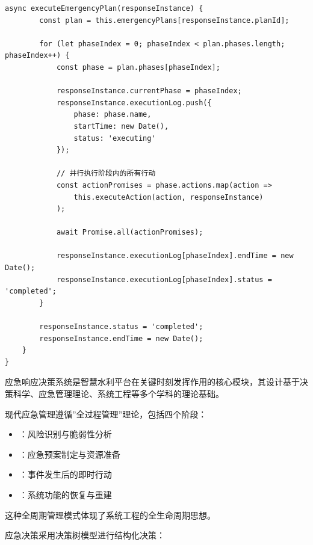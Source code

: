 \begin{lstlisting}[style=javascript]
    async executeEmergencyPlan(responseInstance) {
        const plan = this.emergencyPlans[responseInstance.planId];
        
        for (let phaseIndex = 0; phaseIndex < plan.phases.length; phaseIndex++) {
            const phase = plan.phases[phaseIndex];
            
            responseInstance.currentPhase = phaseIndex;
            responseInstance.executionLog.push({
                phase: phase.name,
                startTime: new Date(),
                status: 'executing'
            });
            
            // 并行执行阶段内的所有行动
            const actionPromises = phase.actions.map(action => 
                this.executeAction(action, responseInstance)
            );
            
            await Promise.all(actionPromises);
            
            responseInstance.executionLog[phaseIndex].endTime = new Date();
            responseInstance.executionLog[phaseIndex].status = 'completed';
        }
        
        responseInstance.status = 'completed';
        responseInstance.endTime = new Date();
    }
}
\end{lstlisting}


应急响应决策系统是智慧水利平台在关键时刻发挥作用的核心模块，其设计基于决策科学、应急管理理论、系统工程等多个学科的理论基础。


现代应急管理遵循''全过程管理''理论，包括四个阶段：

\begin{itemize}
\tightlist
\item
  ：风险识别与脆弱性分析
\item
  ：应急预案制定与资源准备\\
\item
  ：事件发生后的即时行动
\item
  ：系统功能的恢复与重建
\end{itemize}

这种全周期管理模式体现了系统工程的全生命周期思想。


应急决策采用决策树模型进行结构化决策：

